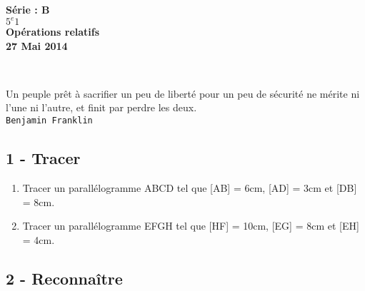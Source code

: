 \documentclass[11pt]{article}
\begin{document}

\begin{minipage}[t]{\textwidth}
  \raggedright
      {\bfseries Série : \textbf{B}}\\
      {\bfseries $5^{e}1$}\\[.35ex]
      \vspace*{-1cm}
      \raggedleft
          {\bfseries Opérations relatifs}\\[.35ex]
          {\bfseries 27 Mai 2014}\\[.35ex]
\end{minipage}\\[1em]

\begin{center}
  \textsf{Un peuple prêt à sacrifier un peu de liberté pour un peu de sécurité ne mérite ni l'une ni l'autre, et finit par perdre les deux.}\\
  \texttt{Benjamin Franklin}
\end{center}

\subsection*{1 - Tracer}
\begin{enumerate}
\item Tracer un parallélogramme ABCD tel que [AB] = 6cm, [AD] = 3cm et [DB] = 8cm.
\item Tracer un parallélogramme EFGH tel que [HF] = 10cm, [EG] = 8cm et [EH] = 4cm.
\end{enumerate}

\subsection*{2 - Reconnaître}
\end{document}
